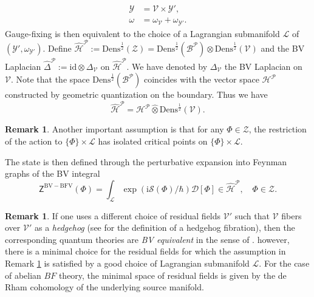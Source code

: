 \documentclass[11pt,colorinlistoftodos]{amsart}
\numberwithin{equation}{subsection}
\theoremstyle{plain}
\theoremstyle{definition}
\newtheorem{rem}[thm]{Remark}
\theoremstyle{remark}
\newcommand{\calY}{\mathcal{Y}}
\newcommand{\id}{\mathrm{id}}
\newcommand{\calB}{\mathcal{B}}
\newcommand{\calH}{\mathcal{H}}
\newcommand{\calS}{\mathcal{S}}
\newcommand{\calL}{\mathcal{L}}
\newcommand{\calP}{\mathcal{P}}
\let\Hat=\widehat
\newcommand{\I}{\mathrm{i}}
\newcommand{\calV}{\mathcal{V}}
\begin{document}
\begin{align*}
    \calY&=\calV\times \calY',\\
    \omega&=\omega_\calV+\omega_{\calY'}.
\end{align*}
Gauge-fixing is then equivalent to the choice of a Lagrangian submanifold $\calL$ of $(\calY',\omega_{\calY'})$. Define $\Hat{\calH}^\calP:=\mathrm{Dens}^\frac{1}{2}(\mathcal{Z})=\mathrm{Dens}^\frac{1}{2}(\calB^\calP)\widehat{\otimes}\mathrm{Dens}^{\frac{1}{2}}(\calV)$ and the BV Laplacian $\Hat{\Delta}^\calP:=\id\otimes \Delta_{\calV}$ on $\Hat{\calH}^\calP$. We have denoted by $\Delta_\calV$ the BV Laplacian on $\calV$.
Note that the space $\mathrm{Dens}^\frac{1}{2}(\calB^\calP)$ coincides with the vector space $\calH^\calP$ constructed by geometric quantization on the boundary. Thus we have 
\[
\Hat{\calH}^\calP=\calH^\calP\widehat{\otimes}\mathrm{Dens}^\frac{1}{2}(\calV).
\]
\begin{rem}
\label{rem:assumption}
Another important assumption is that for any $\Phi\in \mathcal{Z}$, the restriction of the action to $\{\Phi\}\times \calL$ has isolated critical points on $\{\Phi\}\times\calL$.
\end{rem}
The state is then defined through the perturbative expansion into Feynman graphs of the BV integral \begin{equation}
    \label{eq:state}
    \mathsf{Z}^{\scriptscriptstyle\mathrm{BV-BFV}}(\Phi)=\int_\calL \exp\left(\I\calS(\Phi)/\hbar\right)\mathscr{D}[\Phi]\in\widehat{\calH}^\calP,\quad \Phi\in\mathcal{Z}.
\end{equation}

\begin{rem}
If one uses a different choice of residual fields $\calV'$ such that $\calV$ fibers over $\calV'$ as a \emph{hedgehog} (see \cite{CMR2} for the definition of a hedgehog fibration), then the corresponding quantum theories are \emph{BV equivalent} in the sense of \cite{CMR2}. however, there is a minimal choice for the residual fields for which the assumption in Remark \ref{rem:assumption} is satisfied by a good choice of Lagrangian submanifold $\calL$. For the case of abelian $BF$ theory, the minimal space of residual fields is given by the de Rham cohomology of the underlying source manifold.
\end{rem}
\end{document}

